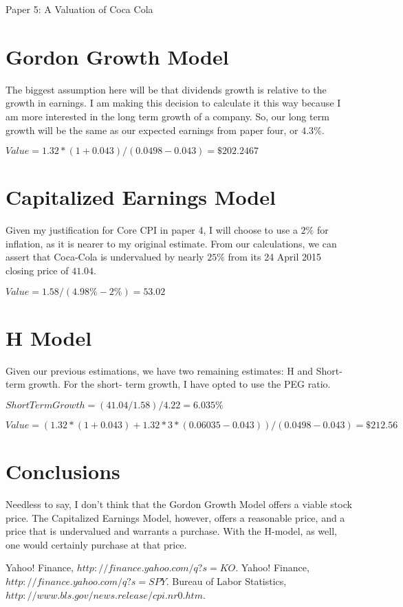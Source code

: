 \documentclass[11pt,letterpaper,english]{article}
\begin{document}
\newpage
\Large\Large\Large\begin{center}
Paper 5: A Valuation of Coca Cola
\end{center}

\section*{Gordon Growth Model}
The biggest assumption here will be that dividends growth is relative to the growth in earnings. I
am making this decision to calculate it this way because I am more interested in the long term 
growth of a company. So, our long term growth will be the same as our expected earnings from paper 
four, or $4.3\%$.

\begin{center}
$Value = 1.32 * (1 + 0.043) / (0.0498 - 0.043) = \$ 202.2467$
\end{center}


\section*{Capitalized Earnings Model}
Given my justification for Core CPI in paper 4, I will choose to use a $2\%$ for inflation, as it 
is nearer to my original estimate. From our calculations, we can assert that Coca-Cola is undervalued
by nearly $25\%$ from its 24 April 2015 closing price of $41.04$.

\begin{center}
$Value = 1.58 / (4.98\% - 2\%) = 53.02$
\end{center}


\section*{H Model}
Given our previous estimations, we have two remaining estimates: H and Short-term growth. For the short-
term growth, I have opted to use the PEG ratio.

\begin{center}
$ShortTermGrowth = (41.04 / 1.58) / 4.22 = 6.035\%$
\end{center}

\begin{center}
$Value = (1.32*(1+0.043)+1.32*3*(0.06035-0.043))/(0.0498-0.043) = \$ 212.56$
\end{center}


\section*{Conclusions}
Needless to say, I don't think that the Gordon Growth Model offers a viable stock price. The Capitalized
Earnings Model, however, offers a reasonable price, and a price that is undervalued and warrants
a purchase. With the H-model, as well, one would certainly purchase at that price.


\newpage
\begin{thebibliography}{9}
    Yahoo! Finance,
    \emph{$http://finance.yahoo.com/q?s=KO$}.
    Yahoo! Finance,
    \emph{$http://finance.yahoo.com/q?s=SPY$}.
    Bureau of Labor Statistics,
    \emph{$http://www.bls.gov/news.release/cpi.nr0.htm$}.
\end{thebibliography}
\end{document}
